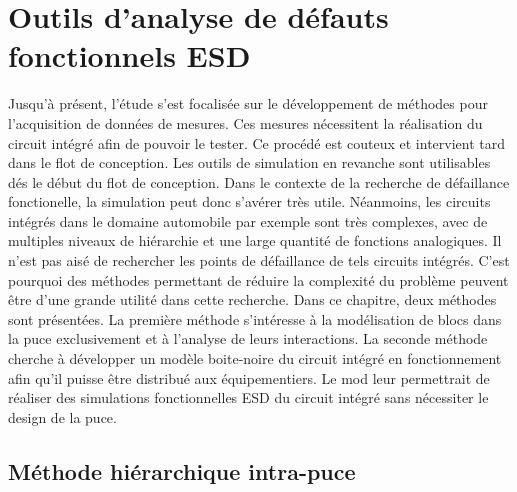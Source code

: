 \chapter{Outils d'analyse de défauts fonctionnels ESD}
\label{chap:4}

Jusqu'à présent, l'étude s'est focalisée sur le développement de méthodes pour l'acquisition de données de mesures.
Ces mesures nécessitent la réalisation du circuit intégré afin de pouvoir le tester.
Ce procédé est couteux et intervient tard dans le flot de conception.
Les outils de simulation en revanche sont utilisables dés le début du flot de conception.
Dans le contexte de la recherche de défaillance fonctionelle, la simulation peut donc s'avérer très utile.
Néanmoins, les circuits intégrés dans le domaine automobile par exemple sont très complexes, avec de multiples niveaux de hiérarchie et une large quantité de fonctions analogiques.
Il n'est pas aisé de rechercher les points de défaillance de tels circuits intégrés.
C'est pourquoi des méthodes permettant de réduire la complexité du problème peuvent être d'une grande utilité dans cette recherche.
Dans ce chapitre, deux méthodes sont présentées.
La première méthode s'intéresse à la modélisation de blocs dans la puce exclusivement et à l'analyse de leurs interactions.
La seconde méthode cherche à développer un modèle boite-noire du circuit intégré en fonctionnement afin qu'il puisse être distribué aux équipementiers.
Le mod leur permettrait de réaliser des simulations fonctionnelles ESD du circuit intégré sans nécessiter le design de la puce.

\section{Méthode hiérarchique intra-puce}

